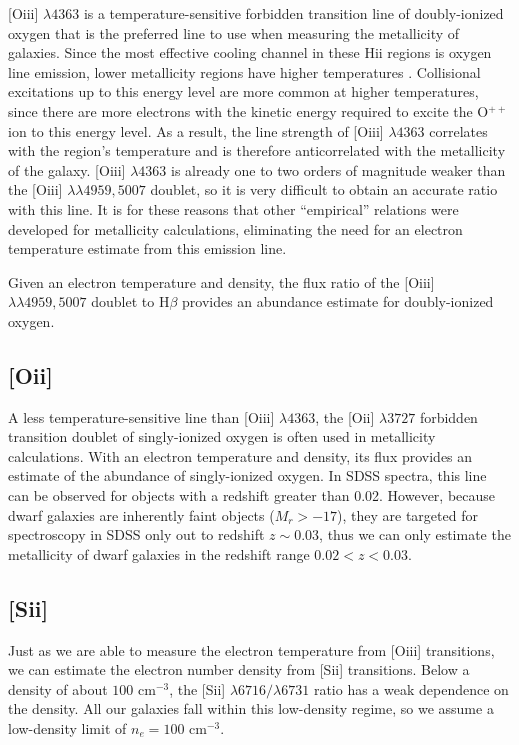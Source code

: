 [O{\sc iii}] $\lambda 4363$ is a temperature-sensitive forbidden transition line 
of doubly-ionized oxygen that is the preferred line to use when measuring the 
metallicity of galaxies.  Since the most effective cooling channel in these 
H{\sc ii} regions is oxygen line emission, lower metallicity regions have higher 
temperatures  \citep{Saintonge07}.  Collisional excitations up to this energy 
level are more common at higher temperatures, since there are more electrons 
with the kinetic energy required to excite the O$^{++}$ ion to this energy 
level.  As a result, the line strength of [O{\sc iii}] $\lambda 4363$ correlates 
with the region's temperature and is therefore anticorrelated with the 
metallicity of the galaxy.  [O{\sc iii}] $\lambda 4363$ is already one to two 
orders of magnitude weaker than the [O{\sc iii}] $\lambda \lambda 4959, 5007$ 
doublet, so it is very difficult to obtain an accurate ratio with this line.  It 
is for these reasons that other ``empirical'' relations were developed for 
metallicity calculations, eliminating the need for an electron temperature 
estimate from this emission line.

Given an electron temperature and density, the flux ratio of the [O{\sc iii}] 
$\lambda \lambda 4959, 5007$ doublet to H$\beta$ provides an abundance estimate 
for doubly-ionized oxygen.



\subsection{[O{\sc ii}]}
A less temperature-sensitive line than [O{\sc iii}] $\lambda 4363$, the 
[O{\sc ii}] $\lambda 3727$ forbidden transition doublet of singly-ionized 
oxygen is often used in metallicity calculations.  With an electron temperature 
and density, its flux provides an estimate of the abundance of singly-ionized 
oxygen.  In SDSS spectra, this line can be observed for objects with a redshift 
greater than 0.02.  However, because dwarf galaxies are inherently faint objects 
($M_r > -17$), they are targeted for spectroscopy in SDSS only out to redshift 
$z\sim 0.03$, thus we can only estimate the metallicity of dwarf galaxies in the 
redshift range $0.02 < z < 0.03$.



\subsection{[S{\sc ii}]}
Just as we are able to measure the electron temperature from [O{\sc iii}] 
transitions, we can estimate the electron number density from [S{\sc ii}] 
transitions.  Below a density of about $100 \text{ cm}^{-3}$, the [S{\sc ii}] 
$\lambda 6716 / \lambda 6731$ ratio has a weak dependence on the density.  All 
our galaxies fall within this low-density regime, so we assume a low-density 
limit of $n_e = 100 \text{ cm}^{-3}$.

